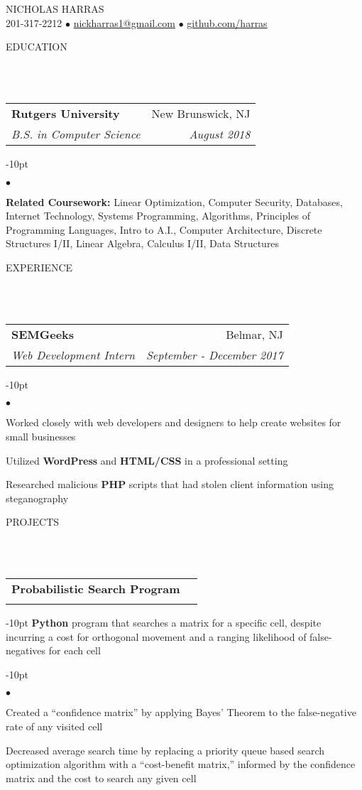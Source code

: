 \documentclass[12pt]{article}
\makeatletter
\newcommand{\mailto}[1]{
	\href{mailto:#1}{#1}
}
\newcommand{\contact}[2]{
	\vspace*{-8pt}
	\begin{center}
		{#1}\\ %
		#2
	\end{center}
	\vspace*{-12pt}
}
\newcommand{\header}[1]{
	\vspace*{12pt} %
	{\hspace*{-14pt}\vspace*{6pt} #1}
	\vspace*{-6pt} 
	\lineunder
}
\newcommand{\lineunder}{
	\vspace*{-8pt} \\ 
	\hspace*{-18pt} 
	\hrulefill \\
}
\newcommand{\subheading}[4]{
 	\vspace{5pt}
    	\begin{tabular*}{1.01\textwidth}
    		{l@{\extracolsep{\fill}}r}
      		\hspace{-16pt}\textbf{#1} & #2 \\
      		\hspace{-16pt}\textit{\small#3} & \textit{\small #4} \\
    	\end{tabular*}
    \vspace{-4pt}
}
\newenvironment{achievements}{
\begin{adjustwidth}{-10pt}{}
  \begin{list}{$\bullet$}{
  	\topsep 0pt \itemsep -4pt}}
  	{\vspace*{2pt}\end{list}
\end{adjustwidth}
}
\makeatother
\begin{document}
\small
\smallskip
\vspace*{-40pt}

\contact{\huge{N}\LARGE{ICHOLAS} \huge{H}\LARGE{ARRAS}}{201-317-2212 $\bullet$ \mailto{nickharras1@gmail.com} $\bullet$ \href{https://www.github.com/harras}{github.com/harras}}

\header{EDUCATION}

\subheading
	{Rutgers University}{New Brunswick, NJ}
	{B.S. in Computer Science}{August 2018}
	\begin{achievements}	
	\item{\bf Related Coursework:} Linear Optimization, Computer Security, Databases, Internet Technology, Systems Programming, Algorithms, Principles of Programming Languages, Intro to A.I., Computer Architecture, Discrete Structures I/II, Linear Algebra, Calculus I/II, Data Structures
	\end{achievements}

\header{EXPERIENCE}

\subheading
	{SEMGeeks}{Belmar, NJ}
	{Web Development Intern}{September - December 2017}
	\begin{achievements}
		\item Worked closely with web developers and designers to help create websites for small businesses
		\item Utilized \textbf{WordPress} and \textbf{HTML/CSS} in a professional setting
		\item Researched malicious \textbf{PHP} scripts that had stolen client information using steganography
	\end{achievements}


\header{PROJECTS}
\subheading{Probabilistic Search Program}{}{}{}
	\vspace{-15pt}	
	\begin{adjustwidth}{-10pt}{}
	\textbf{Python} program that searches a matrix for a specific cell, despite incurring a cost for orthogonal movement and a ranging likelihood of false-negatives for each cell
	\end{adjustwidth}
	\begin{achievements}
		\item Created a ``confidence matrix'' by applying Bayes' Theorem to the false-negative rate of any visited cell
		\vspace{4pt}		
		\item Decreased average search time by replacing a priority queue based search optimization algorithm with a ``cost-benefit matrix,'' informed by the confidence matrix and the cost to search any given cell
	\end{achievements}
\end{document}
